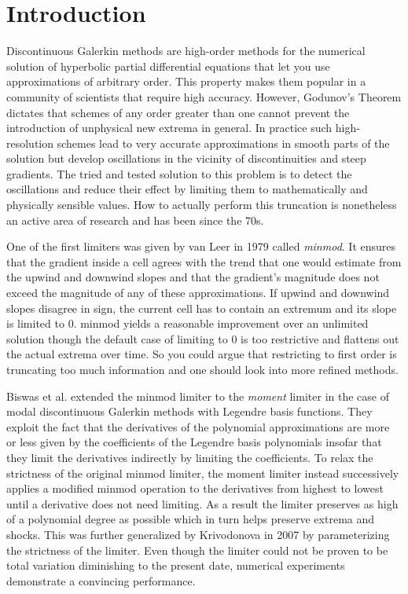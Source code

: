 \section{Introduction}

Discontinuous Galerkin methods are high-order methods for the numerical solution of hyperbolic partial differential equations that let you use approximations of arbitrary order.
This property makes them popular in a community of scientists that require high accuracy.
However, Godunov's Theorem dictates that schemes of any order greater than one cannot prevent the introduction of unphysical new extrema in general.
In practice such high-resolution schemes lead to very accurate approximations in smooth parts of the solution but develop oscillations in the vicinity of discontinuities and steep gradients.
The tried and tested solution to this problem is to detect the oscillations and reduce their effect by limiting them to mathematically and physically sensible values.
How to actually perform this truncation is nonetheless an active area of research and has been since the 70s.

One of the first limiters was given by van Leer in 1979 called \emph{minmod}\cite{VanLeer1979}.
It ensures that the gradient inside a cell agrees with the trend that one would estimate from the upwind and downwind slopes and that the gradient's magnitude does not exceed the magnitude of any of these approximations.
If upwind and downwind slopes disagree in sign, the current cell has to contain an extremum and its slope is limited to $0$.
minmod yields a reasonable improvement over an unlimited solution though the default case of limiting to $0$ is too restrictive and flattens out the actual extrema over time.
So you could argue that restricting to first order is truncating too much information and one should look into more refined methods.

Biswas et al. extended the minmod limiter to the \emph{moment} limiter\cite{Biswas1994} in the case of modal discontinuous Galerkin methods with Legendre basis functions.
They exploit the fact that the derivatives of the polynomial approximations are more or less given by the coefficients of the Legendre basis polynomials insofar that they limit the derivatives indirectly by limiting the coefficients.
To relax the strictness of the original minmod limiter, the moment limiter instead successively applies a modified minmod operation to the derivatives from highest to lowest until a derivative does not need limiting.
As a result the limiter preserves as high of a polynomial degree as possible which in turn helps preserve extrema and shocks.
This was further generalized by Krivodonova in 2007 by parameterizing the strictness of the limiter\cite{Krivodonova}.
Even though the limiter could not be proven to be total variation diminishing to the present date, numerical experiments demonstrate a convincing performance.

